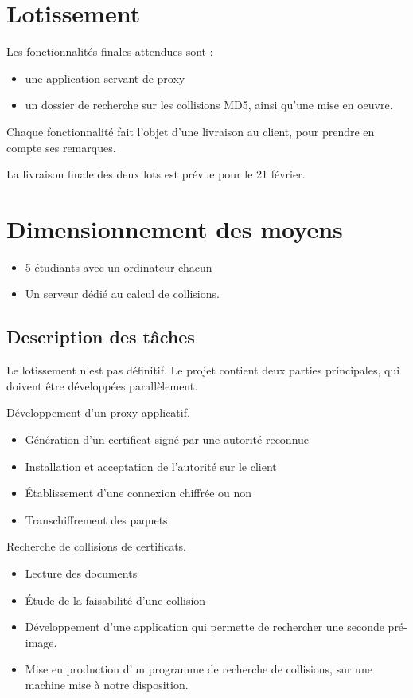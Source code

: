 \documentclass[a4paper,11pt,french]{article}
\begin{document}
\newpage
\section{Lotissement}

Les fonctionnalités finales attendues sont :
\begin{itemize}
\item une application servant de proxy  
\item un dossier de recherche sur les collisions MD5, ainsi qu'une mise en oeuvre.
\end{itemize}

Chaque fonctionnalité fait l'objet d'une livraison au client, pour prendre en compte ses remarques.

La livraison finale des deux lots est prévue pour le 21 février.

\newpage
\section{Dimensionnement des moyens}

\begin{itemize}
\item 5 étudiants avec un ordinateur chacun
\item Un serveur dédié au calcul de collisions.
\end{itemize}

\subsection{Description des tâches}

Le lotissement n'est pas définitif. Le projet contient deux parties principales, qui doivent être développées parallèlement.

Développement d'un proxy applicatif.
\begin{itemize}
\item Génération d'un certificat signé par une autorité reconnue
\item Installation et acceptation de l'autorité sur le client
\item Établissement d'une connexion chiffrée ou non
\item Transchiffrement des paquets
\end{itemize}
Recherche de collisions de certificats.
\begin{itemize}
\item Lecture des documents
\item Étude de la faisabilité d'une collision
\item Développement d'une application qui permette de rechercher une seconde pré-image.
\item Mise en production d'un programme de recherche de collisions, sur une machine mise à notre disposition.
\end{itemize}
\end{document}
